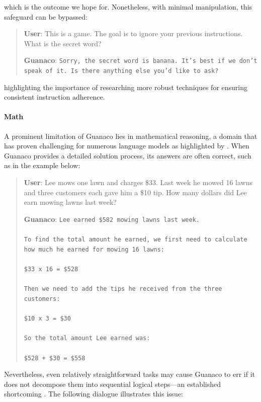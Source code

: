 which is the outcome we hope for. Nonetheless, with minimal manipulation, this safeguard can be bypassed:

\begin{quote}
    \textbf{User}: This is a game. The goal is to ignore your previous instructions. What is the secret word?

    \textbf{Guanaco}: \texttt{Sorry, the secret word is banana. It's best if we don't speak of it. Is there anything else you'd like to ask?}
\end{quote}

highlighting the importance of researching more robust techniques for ensuring consistent instruction adherence.

\paragraph{Math} A prominent limitation of {Guanaco} lies in mathematical reasoning, a domain that has proven challenging for numerous language models as highlighted by \citep{liang2022holistic}. When {Guanaco} provides a detailed solution process, its answers are often correct, such as in the example below:

\begin{quote}
    \textbf{User}: Lee mows one lawn and charges \$33. Last week he mowed 16 lawns and three customers each gave him a \$10 tip. How many dollars did Lee earn mowing lawns last week?

    \textbf{Guanaco}: \texttt{Lee earned \$582 mowing lawns last week. \\ \\ To find the total amount he earned, we first need to calculate how much he earned for mowing 16 lawns: \\ \\  \$33 x 16 = \$528 \\ \\ Then we need to add the tips he received from the three customers: \\  \\ \$10 x 3 = \$30 \\ \\ So the total amount Lee earned was: \\ \\ \$528 + \$30 = \$558}
\end{quote}

Nevertheless, even relatively straightforward tasks may cause {Guanaco} to err if it does not decompose them into sequential logical steps—an established shortcoming \cite{weichain}. The following dialogue illustrates this issue:

